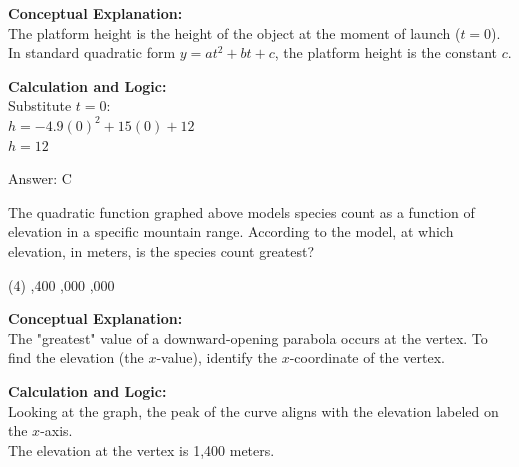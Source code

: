 \documentclass[11pt,paper=a4,answers]{exam}
\begin{document}
\begin{questions}
\begin{solution}
\textbf{Conceptual Explanation:} \\
The platform height is the height of the object at the moment of launch ($t=0$). In standard quadratic form $y = at^2 + bt + c$, the platform height is the constant $c$.

\vspace{20pt}

\textbf{Calculation and Logic:} \\
Substitute $t = 0$: \\
$h = -4.9(0)^2 + 15(0) + 12$ \\
$h = 12$

\vspace{25pt}

Answer: \colorbox{yellow!100}{C}
\end{solution}

\vspace{40pt}

\question
\begin{center}
\end{center}
The quadratic function graphed above models species count as a function of elevation in a specific mountain range. According to the model, at which elevation, in meters, is the species count greatest?
\begin{tasks}(4)
    ,400
    ,000
    ,000
\end{tasks}

\begin{solution}
\textbf{Conceptual Explanation:} \\
The "greatest" value of a downward-opening parabola occurs at the vertex. To find the elevation (the $x$-value), identify the $x$-coordinate of the vertex.

\vspace{20pt}

\textbf{Calculation and Logic:} \\
Looking at the graph, the peak of the curve aligns with the elevation labeled on the $x$-axis. \\
The elevation at the vertex is 1,400 meters.


\end{solution}
\end{questions}
\end{document}
